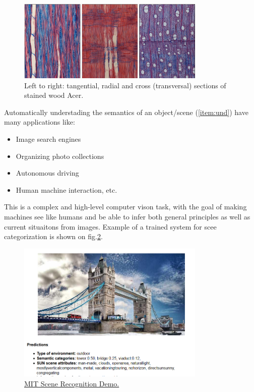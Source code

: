 \begin{figure}[H]
\begin{center}
\includegraphics[width=0.8\textwidth]{fig/woodphotoid}
\end{center}
\caption{Left to right: tangential, radial and cross (transversal) sections of stained wood Acer.}
\label{fig:woodphotoid}
\end{figure}

Automatically understading the semantics of an object/scene (\ref{item:und}) have many applications like:
\begin{itemize}
\item Image search engines
\item Organizing photo collections
\item Autonomous driving
\item Human machine interaction, etc.
\end{itemize}

This is a complex and high-level computer vison task, with the goal of making machines see like humans and be able to infer both general principles as well as current situaitons from images. Example of a trained system for scee categorization is shown on fig.\ref{fig:mitdemo}.
\begin{figure}[H]
\begin{center}
\includegraphics[width=0.8\textwidth]{fig/mitdemo}
\end{center}
\caption{ \href{http://places.csail.mit.edu/demo.html}{MIT Scene Recognition Demo.}}
\label{fig:mitdemo}
\end{figure}

